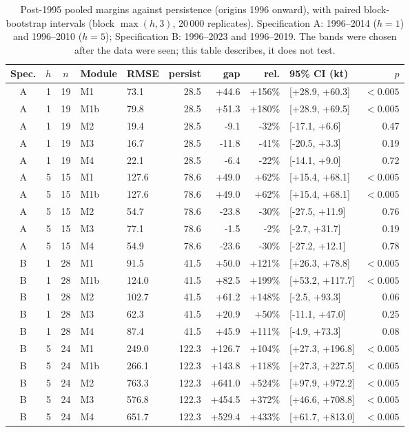 \documentclass[preprint,11pt,authoryear]{elsarticle}
\theoremstyle{remark}
\begin{document}
\begin{table}[!htb]
\centering\footnotesize\setlength{\tabcolsep}{3.5pt}
\caption{Post-1995 pooled margins against persistence (origins 1996 onward), with paired block-bootstrap intervals (block $\max(h,3)$, 20\,000 replicates). Specification A: 1996--2014 ($h=1$) and 1996--2010 ($h=5$); Specification B: 1996--2023 and 1996--2019. The bands were chosen after the data were seen; this table describes, it does not test.}
\label{tab:si_post1995}
\begin{tabular}{@{}cccllrrrlr@{}}
\toprule
Spec. & $h$ & $n$ & Module & RMSE & persist & gap & rel. & 95\% CI (kt) & $p$ \\
\midrule
A & 1 & 19 & M1 & 73.1 & 28.5 & +44.6 & +156\% & [+28.9, +60.3] & $<0.005$ \\
A & 1 & 19 & M1b & 79.8 & 28.5 & +51.3 & +180\% & [+28.9, +69.5] & $<0.005$ \\
A & 1 & 19 & M2 & 19.4 & 28.5 & -9.1 & -32\% & [-17.1, +6.6] & 0.47 \\
A & 1 & 19 & M3 & 16.7 & 28.5 & -11.8 & -41\% & [-20.5, +3.3] & 0.19 \\
A & 1 & 19 & M4 & 22.1 & 28.5 & -6.4 & -22\% & [-14.1, +9.0] & 0.72 \\
A & 5 & 15 & M1 & 127.6 & 78.6 & +49.0 & +62\% & [+15.4, +68.1] & $<0.005$ \\
A & 5 & 15 & M1b & 127.6 & 78.6 & +49.0 & +62\% & [+15.4, +68.1] & $<0.005$ \\
A & 5 & 15 & M2 & 54.7 & 78.6 & -23.8 & -30\% & [-27.5, +11.9] & 0.76 \\
A & 5 & 15 & M3 & 77.1 & 78.6 & -1.5 & -2\% & [-2.7, +31.7] & 0.19 \\
A & 5 & 15 & M4 & 54.9 & 78.6 & -23.6 & -30\% & [-27.2, +12.1] & 0.78 \\
B & 1 & 28 & M1 & 91.5 & 41.5 & +50.0 & +121\% & [+26.3, +78.8] & $<0.005$ \\
B & 1 & 28 & M1b & 124.0 & 41.5 & +82.5 & +199\% & [+53.2, +117.7] & $<0.005$ \\
B & 1 & 28 & M2 & 102.7 & 41.5 & +61.2 & +148\% & [-2.5, +93.3] & 0.06 \\
B & 1 & 28 & M3 & 62.3 & 41.5 & +20.9 & +50\% & [-11.1, +47.0] & 0.25 \\
B & 1 & 28 & M4 & 87.4 & 41.5 & +45.9 & +111\% & [-4.9, +73.3] & 0.08 \\
B & 5 & 24 & M1 & 249.0 & 122.3 & +126.7 & +104\% & [+27.3, +196.8] & $<0.005$ \\
B & 5 & 24 & M1b & 266.1 & 122.3 & +143.8 & +118\% & [+27.3, +227.5] & $<0.005$ \\
B & 5 & 24 & M2 & 763.3 & 122.3 & +641.0 & +524\% & [+97.9, +972.2] & $<0.005$ \\
B & 5 & 24 & M3 & 576.8 & 122.3 & +454.5 & +372\% & [+46.6, +708.8] & $<0.005$ \\
B & 5 & 24 & M4 & 651.7 & 122.3 & +529.4 & +433\% & [+61.7, +813.0] & $<0.005$ \\
\bottomrule
\end{tabular}
\end{table}
\end{document}
